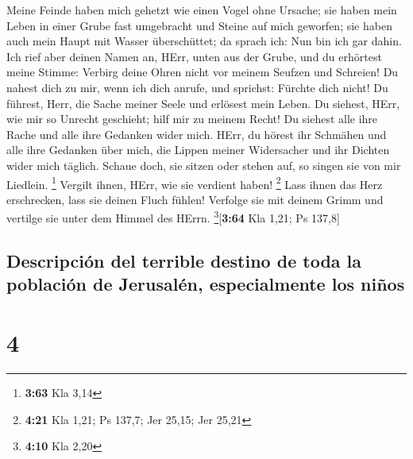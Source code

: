  Meine Feinde haben mich gehetzt wie einen Vogel ohne
Ursache;  sie haben mein Leben in einer Grube fast
umgebracht und Steine auf mich geworfen;  sie haben auch
mein Haupt mit Wasser überschüttet; da sprach ich: Nun bin ich gar
dahin.  Ich rief aber deinen Namen an, HErr, unten aus
der Grube,  und du erhörtest meine Stimme: Verbirg deine
Ohren nicht vor meinem Seufzen und Schreien!  Du nahest
dich zu mir, wenn ich dich anrufe, und sprichst: Fürchte dich nicht!
 Du führest, Herr, die Sache meiner Seele und erlösest
mein Leben.  Du siehest, HErr, wie mir so Unrecht
geschieht; hilf mir zu meinem Recht!  Du siehest alle
ihre Rache und alle ihre Gedanken wider mich.  HErr, du
hörest ihr Schmähen und alle ihre Gedanken über mich, 
die Lippen meiner Widersacher und ihr Dichten wider mich täglich.
 Schaue doch, sie sitzen oder stehen auf, so singen sie
von mir Liedlein. \footnote{\textbf{3:63} Kla 3,14} 
Vergilt ihnen, HErr, wie sie verdient haben! \footnote{\textbf{4:21} Kla
  1,21; Ps 137,7; Jer 25,15; Jer 25,21}  Lass ihnen das
Herz erschrecken, lass sie deinen Fluch fühlen!  Verfolge
sie mit deinem Grimm und vertilge sie unter dem Himmel des HErrn.
\footnote{\textbf{4:10} Kla 2,20}{[}\textbf{3:64} Kla 1,21; Ps 137,8{]}

\hypertarget{descripciuxf3n-del-terrible-destino-de-toda-la-poblaciuxf3n-de-jerusaluxe9n-especialmente-los-niuxf1os}{%
\subsection{Descripción del terrible destino de toda la población de
Jerusalén, especialmente los
niños}\label{descripciuxf3n-del-terrible-destino-de-toda-la-poblaciuxf3n-de-jerusaluxe9n-especialmente-los-niuxf1os}}

\hypertarget{section-3}{%
\section{4}\label{section-3}}

